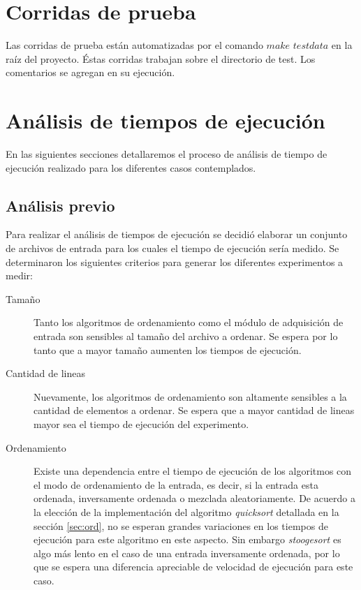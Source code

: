 \documentclass[a4paper,11pt]{article}
\begin{document}
\section{Corridas de prueba}

Las corridas de prueba están automatizadas por el comando \(make\) \(testdata\) 
en la raíz del proyecto. Éstas corridas trabajan sobre el directorio de test.
Los comentarios se agregan en su ejecución.


\section{Análisis de tiempos de ejecución}

En las siguientes secciones detallaremos el proceso de análisis de tiempo de
ejecución realizado para los diferentes casos contemplados.

\subsection{Análisis previo}\label{sec:tiempos}

Para realizar el análisis de tiempos de ejecución se decidió elaborar un
conjunto de archivos de entrada para los cuales el tiempo de ejecución sería
medido. Se determinaron los siguientes criterios para generar los diferentes
experimentos a medir:

\begin{description}

  \item[Tamaño] Tanto los algoritmos de ordenamiento como el módulo
    de adquisición de entrada son sensibles al tamaño del archivo a ordenar. Se
    espera por lo tanto que a mayor tamaño aumenten los tiempos de ejecución.

  \item[Cantidad de lineas] Nuevamente, los algoritmos de ordenamiento son
    altamente sensibles a la cantidad de elementos a ordenar. Se espera que a
    mayor cantidad de lineas mayor sea el tiempo de ejecución del experimento.

  \item[Ordenamiento] Existe una dependencia entre el tiempo de ejecución de
    los algoritmos con el modo de ordenamiento de la entrada, es decir, si la
    entrada esta ordenada, inversamente ordenada o mezclada aleatoriamente. De
    acuerdo a la elección de la implementación del algoritmo \textit{quicksort}
    detallada en la sección \ref{sec:ord}, no se esperan grandes variaciones en
    los tiempos de ejecución para este algoritmo en este aspecto. Sin embargo
    \textit{stoogesort} es algo más lento en el caso de una entrada
    inversamente ordenada, por lo que se espera una diferencia apreciable de
    velocidad de ejecución para este caso.

\end{description}
\end{document}
